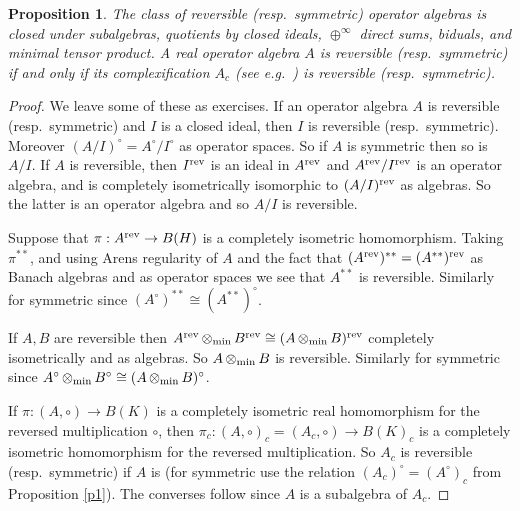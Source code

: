 \documentclass{amsart}
\newtheorem{proposition}[theorem]{Proposition}
\theoremstyle{remark}
\theoremstyle{definition}
\numberwithin{equation}{section}
\DeclareMathOperator{\minten}{\otimes_{\rm min}}
\begin{document}
\begin{proposition} \label{classof} The class of reversible (resp.\ symmetric) operator algebras is closed under 
subalgebras, quotients by closed ideals, $\oplus^\infty$ direct sums, biduals, and minimal tensor product.  A real operator algebra $A$ is  reversible (resp.\ symmetric)
if and only if its complexification $A_c$ 
(see e.g.\ \cite{BReal,BCK}) is  reversible (resp.\ symmetric). 
\end{proposition} 

\begin{proof}   We leave some of these as exercises.
If an operator algebra $A$ is reversible (resp.\ symmetric) and $I$ is a closed ideal, then $I$ is reversible
(resp.\ symmetric).  Moreover $(A/I)^\circ = A^\circ/I^\circ$ as operator spaces.  So if $A$ is symmetric then so is 
$A/I$.   If $A$ is reversible, then $I^{\rm rev}$ is an ideal in $A^{\rm rev}$ and $A^{\rm rev}/I^{\rm rev}$ is 
an operator algebra, and is completely isometrically isomorphic 
to $(A/I)^{\rm rev}$ as algebras.  So the latter is an operator algebra and 
 so $A/I$ is reversible.

Suppose that $\pi : A^{\rm rev} \to B(H)$ is a completely isometric homomorphism.  Taking $\pi^{**}$, and using Arens regularity of $A$ and the fact that $(A^{\rm rev})^{**} = (A^{**})^{\rm rev}$ as Banach algebras and as operator spaces we see that $A^{**}$ is reversible.  
Similarly for symmetric since $(A^{\circ})^{**} \cong (A^{**})^{\circ}$. 

 If $A, B$ are  reversible then 
$A^{\rm rev} \minten B^{\rm rev} \cong (A \minten B)^{\rm rev}$ completely isometrically  and 
as algebras.   So $A \minten B$ is reversible. Similarly for symmetric since $A^{\circ} \minten B^{\circ} \cong (A \minten B)^{\circ}$. 

If $\pi : (A,\circ) \to B(K)$ is a completely isometric real
 homomorphism for the reversed multiplication $\circ$,
then $\pi_c : (A,\circ)_c = (A_c,\circ) \to B(K)_c$ is a completely isometric  homomorphism for the reversed multiplication.    So $A_c$ is 
reversible (resp.\ symmetric) if $A$ is (for symmetric use the relation $(A_c)^\circ = (A^\circ)_c$
from Proposition \ref{p1}).    
The converses follow since $A$ is a subalgebra of $A_c$. 
\end{proof}
\end{document}
